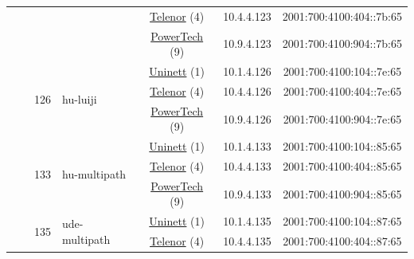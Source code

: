 \begin{small}
\begin{center}
\begin{longtable}{|c|c|c|c|c|c|c|c|}
  &  &  &  & \multicolumn{2}{|c|}{\tiny{\href{https://www.telenor.no}{Telenor} (4)}} & \tiny{10.4.4.123} & \tiny{2001:700:4100:404::7b:65} \\* \cline{5-5}\cline{6-6}\cline{7-7}\cline{8-8}
  &  &  &  & \multicolumn{2}{|c|}{\tiny{\href{http://www.powertech.no}{PowerTech} (9)}} & \tiny{10.9.4.123} & \tiny{2001:700:4100:904::7b:65} \\* \cline{3-3}\cline{4-4}\cline{5-5}\cline{6-6}\cline{7-7}\cline{8-8}
  &  & \multirow{3}{*}{\tiny{126}} & \multicolumn{1}{|l|}{\multirow{3}{*}{\tiny{hu-luiji}}} & \multicolumn{2}{|c|}{\tiny{\href{https://www.uninett.no}{Uninett} (1)}} & \tiny{10.1.4.126} & \tiny{2001:700:4100:104::7e:65} \\* \cline{5-5}\cline{6-6}\cline{7-7}\cline{8-8}
  &  &  &  & \multicolumn{2}{|c|}{\tiny{\href{https://www.telenor.no}{Telenor} (4)}} & \tiny{10.4.4.126} & \tiny{2001:700:4100:404::7e:65} \\* \cline{5-5}\cline{6-6}\cline{7-7}\cline{8-8}
  &  &  &  & \multicolumn{2}{|c|}{\tiny{\href{http://www.powertech.no}{PowerTech} (9)}} & \tiny{10.9.4.126} & \tiny{2001:700:4100:904::7e:65} \\* \cline{3-3}\cline{4-4}\cline{5-5}\cline{6-6}\cline{7-7}\cline{8-8}
  &  & \multirow{3}{*}{\tiny{133}} & \multicolumn{1}{|l|}{\multirow{3}{*}{\tiny{hu-multipath}}} & \multicolumn{2}{|c|}{\tiny{\href{https://www.uninett.no}{Uninett} (1)}} & \tiny{10.1.4.133} & \tiny{2001:700:4100:104::85:65} \\* \cline{5-5}\cline{6-6}\cline{7-7}\cline{8-8}
  &  &  &  & \multicolumn{2}{|c|}{\tiny{\href{https://www.telenor.no}{Telenor} (4)}} & \tiny{10.4.4.133} & \tiny{2001:700:4100:404::85:65} \\* \cline{5-5}\cline{6-6}\cline{7-7}\cline{8-8}
  &  &  &  & \multicolumn{2}{|c|}{\tiny{\href{http://www.powertech.no}{PowerTech} (9)}} & \tiny{10.9.4.133} & \tiny{2001:700:4100:904::85:65} \\* \cline{3-3}\cline{4-4}\cline{5-5}\cline{6-6}\cline{7-7}\cline{8-8}
  &  & \multirow{3}{*}{\tiny{135}} & \multicolumn{1}{|l|}{\multirow{3}{*}{\tiny{ude-multipath}}} & \multicolumn{2}{|c|}{\tiny{\href{https://www.uninett.no}{Uninett} (1)}} & \tiny{10.1.4.135} & \tiny{2001:700:4100:104::87:65} \\* \cline{5-5}\cline{6-6}\cline{7-7}\cline{8-8}
  &  &  &  & \multicolumn{2}{|c|}{\tiny{\href{https://www.telenor.no}{Telenor} (4)}} & \tiny{10.4.4.135} & \tiny{2001:700:4100:404::87:65} \\* \cline{5-5}\cline{6-6}\cline{7-7}\cline{8-8}

\end{longtable}
\end{center}
\end{small}
